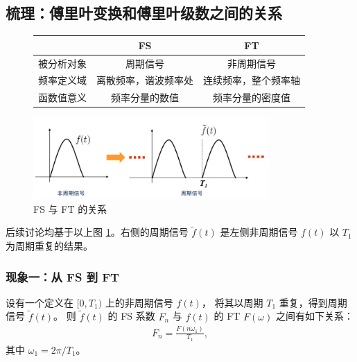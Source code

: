 \subsection{梳理：傅里叶变换和傅里叶级数之间的关系}

\begin{figure}[H]
    \centering
    \begin{tabular}{c||c|c}
        \textbf{ } & \textbf{FS} & \textbf{FT} \\
        \hline
        被分析对象 & 周期信号 & 非周期信号 \\
        \hline
        频率定义域 & 离散频率，谐波频率处 & 连续频率，整个频率轴 \\
        \hline
        函数值意义 & 频率分量的数值 & 频率分量的密度值 \\
    \end{tabular}
\end{figure}

\begin{figure}[H]
    \centering
    \includegraphics[width = 0.8\textwidth]{chap2/img/fs-ft.png}
    \caption{FS 与 FT 的关系}
    \label{fig:fs-ft}
\end{figure}

后续讨论均基于以上图 \ref{fig:fs-ft}。右侧的周期信号 $\tilde{f}(t)$ 是左侧非周期信号 $f(t)$ 以 $T_1$ 为周期重复的结果。

\subsubsection{现象一：从 FS 到 FT}

\begin{theorem}[FS 与 FT 的关系]
    设有一个定义在 $[0, T_1)$ 上的非周期信号 $f(t)$，
    将其以周期 $T_1$ 重复，得到周期信号 $\tilde{f}(t)$。
    则 $\tilde{f}(t)$ 的 FS 系数 $F_n$ 与 $f(t)$ 的 FT $F(\omega)$ 之间有如下关系：
    \begin{align*}
        F_n = \frac{F(n\omega_1)}{T_1},
    \end{align*}
    其中 $\omega_1 = 2\pi / T_1$。
\end{theorem}

